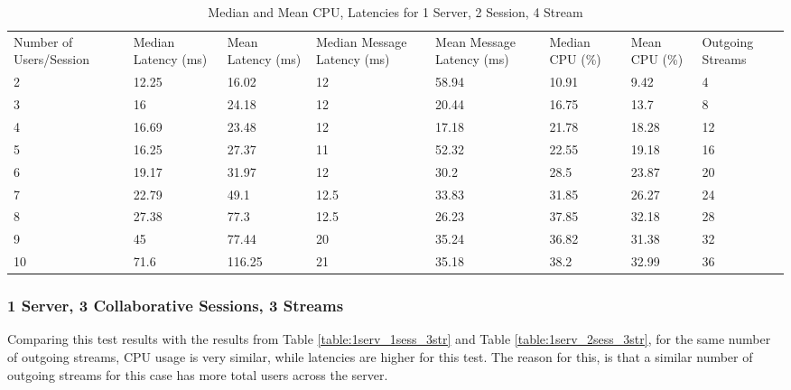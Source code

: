 \begin{table}
\caption{Median and Mean CPU, Latencies for 1 Server, 2 Session, 4 Stream}
\label{table:1serv_2sess_4str}
\begin{tabu} to\linewidth{|X[c]|X[c]|X[c]|X[c]|X[c]|X[c]|X[c]|X[c]|}
\everyrow{\hline}
\hline
Number of Users/Session & Median Latency (ms) & Mean Latency (ms) & Median Message Latency (ms) & Mean Message Latency (ms) & Median CPU (\%) & Mean CPU (\%) & Outgoing Streams\\
2 & 12.25 & 16.02 & 12 & 58.94 & 10.91 & 9.42 & 4 \\
3 & 16 & 24.18 & 12 & 20.44 & 16.75 & 13.7 & 8 \\
4 & 16.69 & 23.48 & 12 & 17.18 & 21.78 & 18.28 & 12 \\
5 & 16.25 & 27.37 & 11 & 52.32 & 22.55 & 19.18 & 16 \\
6 & 19.17 & 31.97 & 12 & 30.2 & 28.5 & 23.87 & 20 \\
7 & 22.79 & 49.1 & 12.5 & 33.83 & 31.85 & 26.27 & 24 \\
8 & 27.38 & 77.3 & 12.5 & 26.23 & 37.85 & 32.18 & 28 \\
9 & 45 & 77.44 & 20 & 35.24 & 36.82 & 31.38 & 32 \\
10 & 71.6 & 116.25 & 21 & 35.18 & 38.2 & 32.99 & 36 \\
\end{tabu}
\end{table}

\clearpage\subsubsection{1 Server, 3 Collaborative Sessions, 3 Streams}
\label{sec:1serv_3sess_3str}

Comparing this test results with the results from Table \ref{table:1serv_1sess_3str} and Table \ref{table:1serv_2sess_3str}, for the same number of outgoing streams, CPU usage is very similar, while latencies are higher for this test. The reason for this, is that a similar number of outgoing streams for this case has more total users across the server.


